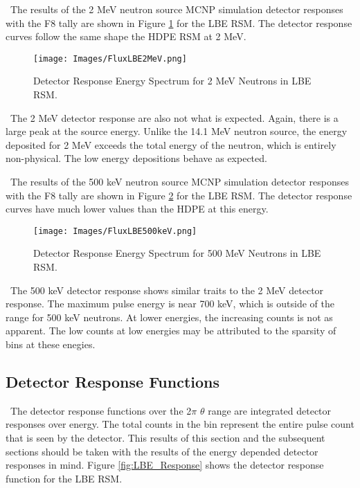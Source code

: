 \documentclass[journal]{IEEEtran}
\let\MYoriglatexcaption\caption
\renewcommand{\caption}[2][\relax]{\MYoriglatexcaption[#2]{#2}}
\begin{document}
    \ The results of the 2 MeV neutron source MCNP simulation detector responses with the F8 tally are shown in Figure \ref{fig:ESpec2} for the LBE RSM. The detector response curves follow the same shape the HDPE RSM at 2 MeV.  
	
	\begin{figure}[ht]
		\texttt{[image: Images/FluxLBE2MeV.png]}
		\centering
		\caption{Detector Response Energy Spectrum for 2 MeV Neutrons in LBE RSM.}
		\label{fig:ESpec2}
	\end{figure}

    \ The 2 MeV detector response are also not what is expected.  Again, there is a large peak at the source energy.  Unlike the 14.1 MeV neutron source, the energy deposited for 2 MeV exceeds the total energy of the neutron, which is entirely non-physical.  The low energy depositions behave as expected. 
	
    \ The results of the 500 keV neutron source MCNP simulation detector responses with the F8 tally are shown in Figure \ref{fig:ESpec3} for the LBE RSM. The detector response curves have much lower values than the HDPE at this energy. 
	
	\begin{figure}[ht]
		\texttt{[image: Images/FluxLBE500keV.png]}
		\centering
		\caption{Detector Response Energy Spectrum for 500 MeV Neutrons in LBE RSM.}
		\label{fig:ESpec3}
	\end{figure}
	
	\ The 500 keV detector response shows similar traits to the 2 MeV detector response.  The maximum pulse energy is near 700 keV, which is outside of the range for 500 keV neutrons. At lower energies, the increasing counts is not as apparent.  The low counts at low energies may be attributed to the sparsity of bins at these enegies. 
	
	\subsection{Detector Response Functions}
	
	\ The detector response functions over the 2$\pi$ $\theta$ range are integrated detector responses over energy. The total counts in the bin represent the entire pulse count that is seen by the detector.  This results of this section and the subsequent sections should be taken with the results of the energy depended detector responses in mind.  Figure \ref{fig:LBE_Response} shows the detector response function for the LBE RSM.
	
\end{document}
